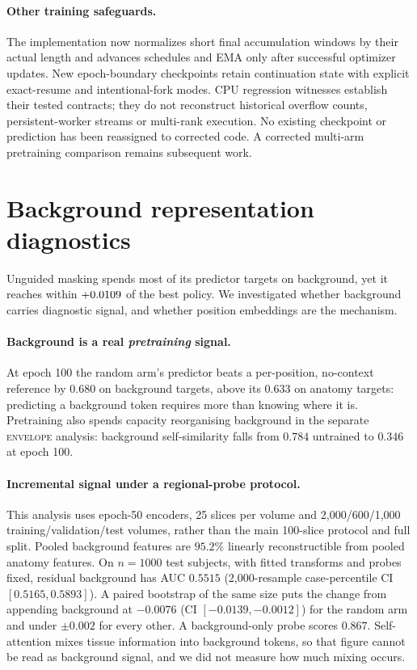 \documentclass{article}
\begin{document}
\paragraph{Other training safeguards.}
The implementation now normalizes short final accumulation windows by their
actual length and advances schedules and EMA only after successful optimizer
updates. New epoch-boundary checkpoints retain continuation state with explicit
exact-resume and intentional-fork modes. CPU regression witnesses establish
their tested contracts; they do not reconstruct historical overflow counts,
persistent-worker streams or multi-rank execution. No existing checkpoint or
prediction has been reassigned to corrected code. A corrected multi-arm
pretraining comparison remains subsequent work.

\section{Background representation diagnostics}
\label{app:bg}

Unguided masking spends most of its predictor targets on background, yet it
reaches within $+0.0109$ of the best policy. We investigated
whether background carries diagnostic signal, and whether position embeddings are
the mechanism.

\paragraph{Background is a real \emph{pretraining} signal.} At epoch 100 the
random arm's predictor beats a per-position, no-context reference by $0.680$ on
background targets, above its $0.633$ on anatomy targets: predicting a background
token requires more than knowing where it is. Pretraining also spends capacity
reorganising background in the separate \textsc{envelope} analysis:
background self-similarity falls from $0.784$
untrained to $0.346$ at epoch 100.

\paragraph{Incremental signal under a regional-probe protocol.}
This analysis uses epoch-50 encoders, 25 slices per volume and
2{,}000/600/1{,}000 training/validation/test volumes, rather than the main
100-slice protocol and full split. Pooled background features are
$95.2\%$ linearly reconstructible from pooled anatomy features. On $n{=}1000$
test subjects, with fitted transforms and probes fixed, residual background has
AUC $0.5515$ (2{,}000-resample case-percentile CI $[0.5165, 0.5893]$).
A paired bootstrap of the same size puts the change from appending background
at $-0.0076$ (CI $[-0.0139, -0.0012]$) for the random arm and under $\pm0.002$ for
every other. A background-only probe scores $0.867$. Self-attention mixes tissue
information into background tokens, so that figure cannot be read as background
signal, and we did not measure how much mixing occurs.
\end{document}
